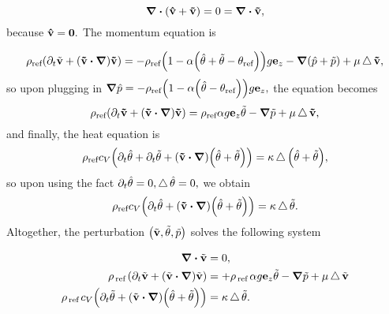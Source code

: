 \documentclass[../main.tex]{subfiles}
\begin{document}
\[
	\divergence{\qty(\vb{\hat{v}}+ \vb{\tilde{v}})} = 0 = \divergence{\vb{\tilde{\vb{v}}}},
\]
because $\vb{\hat{\vb{v}}} = \vb{0}.$ The momentum equation is

\[
	\rho_{\text{ref}}\qty(\partial_t \tilde{\vb{v}} + \qty(\vb{\tilde{v}}\vdot \grad)\vb{\tilde{v}}) = -\rho_{\text{ref}}\qty(1- \alpha\qty(\hat{\theta} + \tilde{\theta} - \theta_{\text{ref}}))g \vb{e}_z - \grad \qty(\hat{p}+ \tilde{p}) + \mu \laplace \vb{\tilde{v}},
\]
so upon plugging in $\grad \hat{p} = - \rho_{\text{ref}}\qty(1 - \alpha\qty(\hat{\theta}- \theta_{\text{ref}}))g \vb{e}_z,$ the equation becomes
\[
	\rho_{\text{ref}}\qty(\partial_t \vb{\tilde{\vb{v}}}+ \qty(\vb{\tilde{v}}\vdot \grad)\vb{\tilde{v}}) = \rho_{\text{ref}} \alpha g \vb{e}_z \tilde{\theta} - \grad \tilde{p} + \mu \laplace \vb{\tilde{v}},
\]
and finally, the heat equation is
\[
	\rho_{\text{ref}} c_V\qty(\partial_t \hat{\theta} + \partial_t \tilde{\theta} + \qty(\vb{\tilde{v}}\vdot \grad)\qty(\hat{\theta}+ \tilde{\theta}))= \kappa \laplace\qty(\hat{\theta} + \tilde{\theta}),
\]
so upon using the fact $\partial_t \hat{\theta} = 0, \operatorname{\bigtriangleup} \hat{\theta} = 0,$ we obtain
\[
	\rho_{\text{ref}} c_V\qty(\partial_t \hat{\theta} + \qty(\vb{\tilde{v}} \vdot \grad)\qty(\hat{\theta}+ \tilde{\theta})) = \kappa \laplace \tilde{\theta}.
\]
Altogether, the perturbation $\qty(\tilde{\vb{v}}, \tilde{\theta}, \tilde{p})$ solves the following system

\begin{align}
	\label{eq:system_perturbations}
	\divergence{\tilde{\vb{v}}} &= 0, \\
	\rho_{\, \text{ref} \,}\qty(\partial_t \tilde{\vb{v}}+ \qty(\tilde{\vb{v}} \vdot \grad)\tilde{\vb{v}}) &= +\rho_{\, \text{ref} \,} \alpha g \vb{e}_z \tilde{\theta} - \grad \tilde{p} + \mu \laplace \tilde{\vb{v}}\\ 
\rho_{\, \text{ref} \,} c_{V}\qty(\partial_t \tilde{\theta} + \qty(\tilde{\vb{v}} \vdot \grad)\qty(\hat{\theta} + \tilde{\theta})) &= \kappa \laplace\tilde{\theta}.
\end{align}
\end{document}
